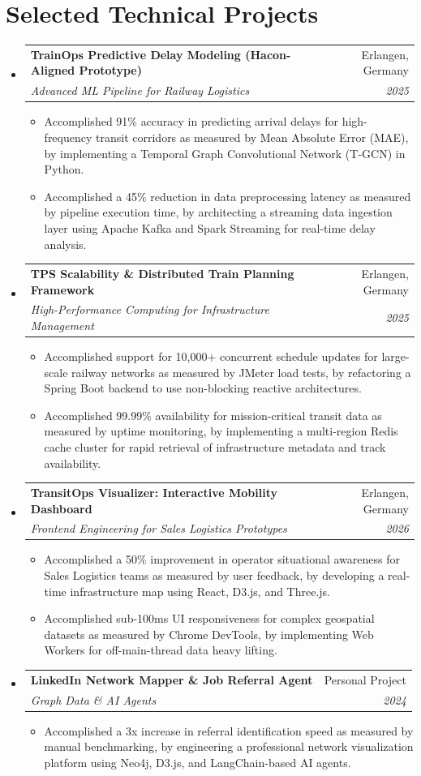 \documentclass[a4paper,10pt]{article}
\makeatletter
\newcommand{\resumeItem}[1]{
  \item\small{#1}
}
\newcommand{\resumeItemListStart}{\begin{itemize}[leftmargin=0.2in]}
\newcommand{\resumeItemListEnd}{\end{itemize}\vspace{-5pt}}
\newcommand{\resumeSubheading}[4]{
  \vspace{-1pt}\item
    \begin{tabular*}{0.97\textwidth}[t]{l@{\extracolsep{\fill}}r}
      \textbf{#1} & #2 \\
      \textit{\small#3} & \textit{\small #4} \\
    \end{tabular*}\vspace{-5pt}
}
\makeatother
\begin{document}
\section{Selected Technical Projects}
\begin{itemize}[leftmargin=0.15in, label={}]
    \resumeSubheading
      {TrainOps Predictive Delay Modeling (Hacon-Aligned Prototype)}{Erlangen, Germany}
      {Advanced ML Pipeline for Railway Logistics}{2025}
      \resumeItemListStart
        \resumeItem{Accomplished 91\% accuracy in predicting arrival delays for high-frequency transit corridors as measured by Mean Absolute Error (MAE), by implementing a Temporal Graph Convolutional Network (T-GCN) in Python.}
        \resumeItem{Accomplished a 45\% reduction in data preprocessing latency as measured by pipeline execution time, by architecting a streaming data ingestion layer using Apache Kafka and Spark Streaming for real-time delay analysis.}
      \resumeItemListEnd

    \resumeSubheading
      {TPS Scalability \& Distributed Train Planning Framework}{Erlangen, Germany}
      {High-Performance Computing for Infrastructure Management}{2025}
      \resumeItemListStart
        \resumeItem{Accomplished support for 10,000+ concurrent schedule updates for large-scale railway networks as measured by JMeter load tests, by refactoring a Spring Boot backend to use non-blocking reactive architectures.}
        \resumeItem{Accomplished 99.99\% availability for mission-critical transit data as measured by uptime monitoring, by implementing a multi-region Redis cache cluster for rapid retrieval of infrastructure metadata and track availability.}
      \resumeItemListEnd

    \resumeSubheading
      {TransitOps Visualizer: Interactive Mobility Dashboard}{Erlangen, Germany}
      {Frontend Engineering for Sales Logistics Prototypes}{2026}
      \resumeItemListStart
        \resumeItem{Accomplished a 50\% improvement in operator situational awareness for Sales Logistics teams as measured by user feedback, by developing a real-time infrastructure map using React, D3.js, and Three.js.}
        \resumeItem{Accomplished sub-100ms UI responsiveness for complex geospatial datasets as measured by Chrome DevTools, by implementing Web Workers for off-main-thread data heavy lifting.}
      \resumeItemListEnd

    \resumeSubheading
      {LinkedIn Network Mapper \& Job Referral Agent}{Personal Project}
      {Graph Data \& AI Agents}{2024}
      \resumeItemListStart
        \resumeItem{Accomplished a 3x increase in referral identification speed as measured by manual benchmarking, by engineering a professional network visualization platform using Neo4j, D3.js, and LangChain-based AI agents.}
      \resumeItemListEnd
\end{itemize}
\end{document}
